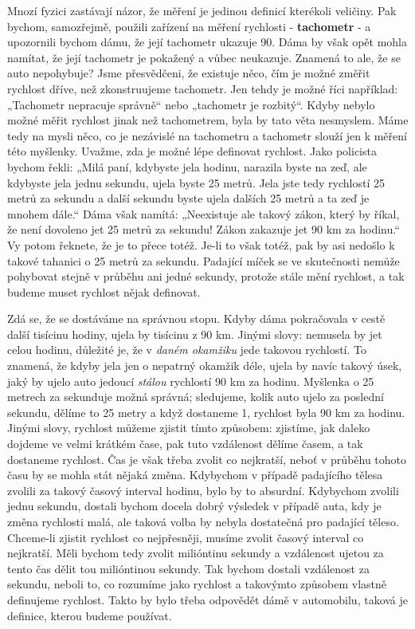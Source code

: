 {    Mnozí fyzici zastávají názor, že měření je jedinou definicí kterékoli veličiny. Pak bychom, 
    samozřejmě, použili zařízení na měření rychlosti - \textbf{tachometr} - a upozornili bychom 
    dámu, že její tachometr ukazuje \num{90}. Dáma by však opět mohla namítat, že její tachometr je 
    pokažený a vůbec neukazuje. Znamená to ale, že se auto nepohybuje? Jsme přesvědčeni, že 
    existuje něco, čím je možné změřit rychlost dříve, než zkonstruujeme tachometr. Jen tehdy je 
    možné říci například: „Tachometr nepracuje správně“ nebo „tachometr je rozbitý“. Kdyby nebylo 
    možné měřit rychlost jinak než tachometrem, byla by tato věta nesmyslem. Máme tedy na mysli 
    něco, co je nezávislé na tachometru a tachometr slouží jen k měření této myšlenky. Uvažme, zda 
    je možné lépe definovat rychlost. Jako policista bychom řekli: „Milá paní, kdybyste jela 
    hodinu, narazila byste na zeď, ale kdybyste jela jednu sekundu, ujela byste \num{25} metrů. 
    Jela jste tedy rychlostí \num{25} metrů za sekundu a další sekundu byste ujela dalších \num{25} 
    metrů a ta zeď je mnohem dále.“ Dáma však namítá: „Neexistuje ale takový zákon, který by říkal, 
    že není dovoleno jet \num{25} metrů za sekundu! Zákon zakazuje jet \num{90} km za hodinu.“ Vy 
    potom řeknete, že je to přece totéž. Je-li to však totéž, pak by asi nedošlo k takové tahanici 
    o \num{25} metrů za sekundu. Padající míček se ve skutečnosti nemůže pohybovat stejně v průběhu 
    ani jedné sekundy, protože stále mění rychlost, a tak budeme muset rychlost nějak definovat.
    
    Zdá se, že se dostáváme na správnou stopu. Kdyby dáma pokračovala v cestě další tisícinu 
    hodiny, ujela by tisícinu z \num{90} km. Jinými slovy: nemusela by jet celou hodinu, důležité 
    je, že v \emph{daném okamžiku} jede takovou rychlostí. To znamená, že kdyby jela jen o nepatrný 
    okamžik déle, ujela by navíc takový úsek, jaký by ujelo auto jedoucí \emph{stálou} rychlostí 
    \num{90} km za hodinu. Myšlenka o \num{25} metrech za sekunduje možná správná; sledujeme, kolik 
    auto ujelo za poslední sekundu, dělíme to \num{25} metry a když dostaneme \num{1}, rychlost 
    byla \num{90} km za hodinu. Jinými slovy, rychlost můžeme zjistit tímto způsobem: zjistíme, jak 
    daleko dojdeme ve velmi krátkém čase, pak tuto vzdálenost dělíme časem, a tak dostaneme 
    rychlost. Čas je však třeba zvolit co nejkratší, neboť v průběhu tohoto času by se mohla stát 
    nějaká změna. Kdybychom v případě padajícího tělesa zvolili za takový časový interval hodinu, 
    bylo by to absurdní. Kdybychom zvolili jednu sekundu, dostali bychom docela dobrý výsledek v 
    případě auta, kdy je změna rychlosti malá, ale taková volba by nebyla dostatečná pro padající 
    těleso. Chceme-li zjistit rychlost co nejpřesněji, musíme zvolit časový interval co nejkratší. 
    Měli bychom tedy zvolit milióntinu sekundy a vzdálenost ujetou za tento čas dělit tou 
    milióntinou sekundy. Tak bychom dostali vzdálenost za sekundu, neboli to, co rozumíme jako 
    rychlost a takovýmto způsobem vlastně definujeme rychlost. Takto by bylo třeba odpovědět dámě v 
    automobilu, taková je definice, kterou budeme používat.
    
}
